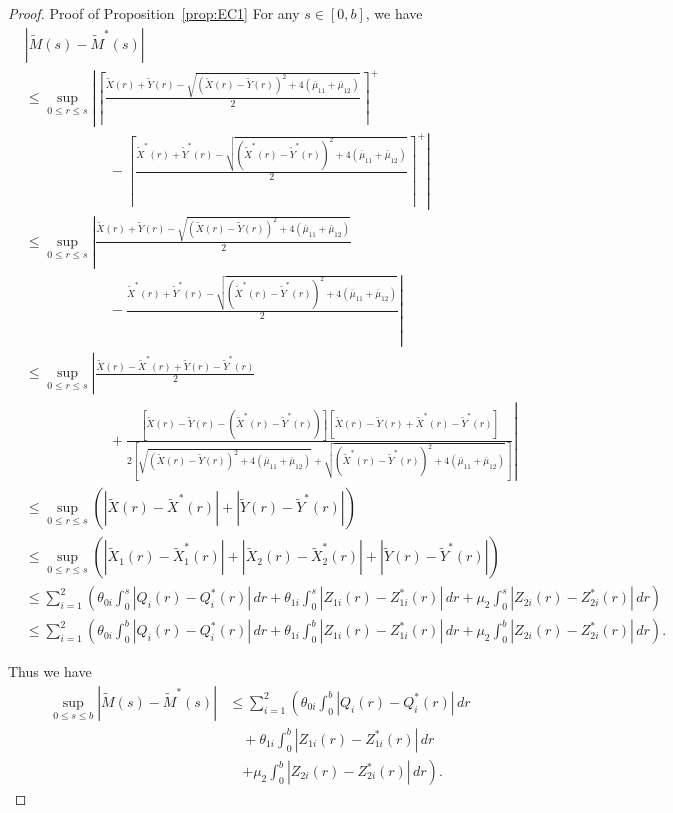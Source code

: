\begin{proof}{Proof of Proposition~\ref{prop:EC1}}
For any $s \in [0, b]$, we have
\begin{equation*}
\begin{aligned}
& |\tilde{M}(s) - \tilde{M}^*(s)| \\
& \leq \sup_{0 \leq r \leq s} \left| \left\lceil \frac{\tilde{X}(r) + \tilde{Y}(r) - \sqrt{(\tilde{X}(r) - \tilde{Y}(r))^2 + 4(\bar{\mu}_{11}+\bar{\mu}_{12})}}{2} \right\rceil^+ \right. \\
& \quad\quad\quad\quad\quad\quad - \left. \left\lceil \frac{\tilde{X}^*(r) + \tilde{Y}^*(r) - \sqrt{(\tilde{X}^*(r) - \tilde{Y}^*(r))^2 + 4(\bar{\mu}_{11}+\bar{\mu}_{12})}}{2} \right\rceil^+ \right| \\
& \leq \sup_{0 \leq r \leq s} \left| \frac{\tilde{X}(r) + \tilde{Y}(r) - \sqrt{(\tilde{X}(r) - \tilde{Y}(r))^2 + 4(\bar{\mu}_{11}+\bar{\mu}_{12})}}{2} \right. \\
& \quad\quad\quad\quad\quad\quad - \left. \frac{\tilde{X}^*(r) + \tilde{Y}^*(r) - \sqrt{(\tilde{X}^*(r) - \tilde{Y}^*(r))^2 + 4(\bar{\mu}_{11}+\bar{\mu}_{12})}}{2} \right| \\
& \leq \sup_{0 \leq r \leq s} \left| \frac{\tilde{X}(r) - \tilde{X}^*(r) + \tilde{Y}(r) - \tilde{Y}^*(r)}{2} \right. \\
& \quad\quad\quad\quad\quad\quad + \left. \frac{[\tilde{X}(r) - \tilde{Y}(r) - (\tilde{X}^*(r) - \tilde{Y}^*(r))][\tilde{X}(r) - \tilde{Y}(r) + \tilde{X}^*(r) - \tilde{Y}^*(r)]}{2[\sqrt{(\tilde{X}(r) - \tilde{Y}(r))^2 + 4(\bar{\mu}_{11}+\bar{\mu}_{12})} + \sqrt{(\tilde{X}^*(r) - \tilde{Y}^*(r))^2 + 4(\bar{\mu}_{11}+\bar{\mu}_{12})}]} \right| \\
& \leq \sup_{0 \leq r \leq s} \left( |\tilde{X}(r) - \tilde{X}^*(r)| + |\tilde{Y}(r) - \tilde{Y}^*(r)| \right) \\
& \leq \sup_{0 \leq r \leq s} \left( |\tilde{X}_1(r) - \tilde{X}_1^*(r)| + |\tilde{X}_2(r) - \tilde{X}_2^*(r)| + |\tilde{Y}(r) - \tilde{Y}^*(r)| \right) \\
& \leq \sum_{i=1}^{2}(\theta_{0i} \int_0^s |Q_i(r) - Q_i^*(r)| \, dr + \theta_{1i} \int_0^s |Z_{1i}(r) - Z_{1i}^*(r)| \, dr + \mu_2 \int_0^s |Z_{2i}(r) - Z_{2i}^*(r)| \, dr )\\
& \leq \sum_{i=1}^{2}(\theta_{0i} \int_0^b |Q_i(r) - Q_i^*(r)| \, dr + \theta_{1i} \int_0^b |Z_{1i}(r) - Z_{1i}^*(r)| \, dr + \mu_2 \int_0^b |Z_{2i}(r) - Z_{2i}^*(r)| \, dr).
\end{aligned}
\end{equation*}

Thus we have
\begin{align}
\sup_{0 \le s \le b} |\tilde{M}(s) - \tilde{M}^*(s)| &\le \sum_{i=1}^{2}\left(\theta_{0i} \int_0^b |Q_i(r) - Q_i^*(r)| \, dr \right. \nonumber \\
&\quad + \theta_{1i} \int_0^b |Z_{1i}(r) - Z_{1i}^*(r)| \, dr \nonumber \\
&\quad \left. + \mu_2 \int_0^b |Z_{2i}(r) - Z_{2i}^*(r)| \, dr\right). \label{eq:EC43}
\end{align}


\end{proof}
